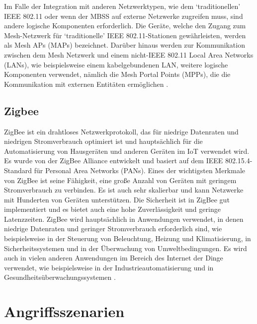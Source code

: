 \documentclass[12pt, a4paper, onecolumn, oneside, toc=bibliographynumbered, liststotoc]{scrreprt} %
\begin{document}
            Im Falle der Integration mit anderen Netzwerktypen, wie dem \enquote*{traditionellen} IEEE 802.11 oder wenn der MBSS auf externe Netzwerke zugreifen muss, sind andere logische Komponenten erforderlich. Die Geräte, welche den Zugang zum Mesh-Netzwerk für \enquote*{traditionelle} IEEE 802.11-Stationen gewährleisten, werden als Mesh APs (MAPs) bezeichnet. Darüber hinaus werden zur Kommunikation zwischen dem Mesh Netzwerk und einem nicht-IEEE 802.11 Local Area Networks (LANs), wie beispielsweise einem kabelgebundenen LAN, weitere logische Komponenten verwendet, nämlich die Mesh Portal Points (MPPs), die die Kommunikation mit externen Entitäten ermöglichen \parencite[4\psqq]{Cilfone.2019}.  %
            
		\section{Zigbee}
            ZigBee ist ein drahtloses Netzwerkprotokoll, das für niedrige Datenraten und niedrigen Stromverbrauch optimiert ist und hauptsächlich für die Automatisierung von Hausgeräten und anderen Geräten im IoT verwendet wird. Es wurde von der ZigBee Alliance entwickelt und basiert auf dem IEEE 802.15.4-Standard für Personal Area Networks (PANs).
            Eines der wichtigsten Merkmale von ZigBee ist seine Fähigkeit, eine große Anzahl von Geräten mit geringem Stromverbrauch zu verbinden. Es ist auch sehr skalierbar und kann Netzwerke mit Hunderten von Geräten unterstützen. Die Sicherheit ist in ZigBee gut implementiert und es bietet auch eine hohe Zuverlässigkeit und geringe Latenzzeiten.
            ZigBee wird hauptsächlich in Anwendungen verwendet, in denen niedrige Datenraten und geringer Stromverbrauch erforderlich sind, wie beispielsweise in der Steuerung von Beleuchtung, Heizung und Klimatisierung, in Sicherheitssystemen und in der Überwachung von Umweltbedingungen. Es wird auch in vielen anderen Anwendungen im Bereich des Internet der Dinge verwendet, wie beispielsweise in der Industrieautomatisierung und in Gesundheitsüberwachungssystemen \parencite[195]{Gessler.2015}. %
	
	\chapter{Angriffsszenarien}
\end{document}
